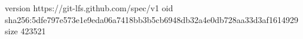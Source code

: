 version https://git-lfs.github.com/spec/v1
oid sha256:5dfe797e573e1e9eda06a7418bb3b5cb6948db32a4e0db728aa33d3af1614929
size 423521
